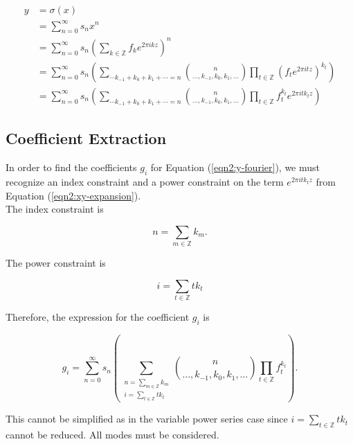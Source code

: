 \documentclass{article}
\begin{document}
    \begin{align}
        y &= \sigma(x) \nonumber \\
        &= \sum_{n=0}^{\infty} s_n x^n \nonumber \\
        &= \sum_{n=0}^{\infty} s_n \left(\sum_{k \in \mathbb{Z}} f_k e^{2\pi i k z}\right)^n \nonumber \\
        &= \sum_{n=0}^{\infty} s_n \left(\sum_{\cdots k_{-1} + k_{0} + k_{1} + \cdots = n} \binom{n}{\ldots, k_{-1}, k_{0}, k_{1}, \ldots} \prod_{t \in \mathbb{Z}} \left(f_t e^{2\pi i t z}\right)^{k_t} \right) \nonumber \\
        &= \sum_{n=0}^{\infty} s_n \left(\sum_{\cdots k_{-1} + k_{0} + k_{1} + \cdots = n} \binom{n}{\ldots, k_{-1}, k_{0}, k_{1}, \ldots} \prod_{t \in \mathbb{Z}} f_t^{k_t} e^{2\pi i t k_t z} \right)
        \label{eqn2:xy-expansion}
    \end{align}

    \subsection{Coefficient Extraction}

    In order to find the coefficients $g_i$ for Equation (\ref{eqn2:y-fourier}), we must recognize an index constraint and a power constraint on the term $e^{2\pi i t k_t z}$ from Equation (\ref{eqn2:xy-expansion}).\\

    The index constraint is

    \begin{equation}
        n = \sum_{m \in \mathbb{Z}} k_m.
    \end{equation}

    The power constraint is

    \begin{equation}
        i = \sum_{t \in \mathbb{Z}} tk_t
    \end{equation}

    Therefore, the expression for the coefficient $g_i$ is

    \begin{equation}
        g_i = \sum_{n=0}^{\infty} s_n \left(\sum_{\substack{n = \sum_{m \in \mathbb{Z}} k_m \\ i=\sum_{t \in \mathbb{Z}} tk_t}} \binom{n}{\ldots, k_{-1}, k_{0}, k_{1}, \dots} \prod_{t \in \mathbb{Z}}f_t^{k_t} \right).
    \end{equation}

    This cannot be simplified as in the variable power series case since $i = \sum_{t \in \mathbb{Z}} tk_t$ cannot be reduced. All modes must be considered.
\end{document}
